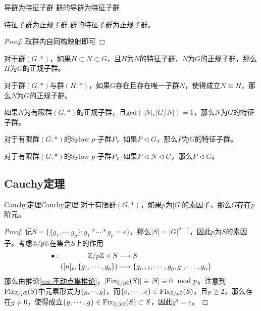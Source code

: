 \begin{proposition}{导群为特征子群}
	群的导群为特征子群
\end{proposition}

\begin{proposition}{特征子群为正规子群}
	群的特征子群为正规子群。
\end{proposition}

\begin{proof}
	取群内自同构映射即可
\end{proof}

\begin{proposition}
	对于群$(G,*)$，如果$H\subset N\subset G$，且$H$为$N$的特征子群，$N$为$G$的正规子群，那么$H$为$G$的正规子群。
\end{proposition}

\begin{proposition}
	对于群$(G,*)$与群$(H,*)$，如果$G$存在且存在唯一子群$N$，使得成立$N\cong H$，那么$N$为$G$的正规子群。
\end{proposition}

\begin{proposition}
	如果$N$为有限群$(G,*)$的正规子群，且$\text{gcd}(|N|,|G/N|)=1$，那么$N$为$G$的特征子群。
\end{proposition}

\begin{proposition}
	对于有限群$(G,*)$的Sylow $p$-子群$P$，如果$P\lhd G$，那么$P$为$G$的特征子群。
\end{proposition}

\begin{proposition}
	对于有限群$(G,*)$的Sylow $p$-子群$P$，如果$P\lhd N\lhd G$，那么$P\lhd G$。
\end{proposition}

\subsection{Cauchy定理}

\begin{theorem}{Cauchy定理}{Cauchy定理}
	对于有限群$(G,*)$，如果$p$为$|G|$的素因子，那么$G$存在$p$阶元。
\end{theorem}

\begin{proof}
	记$S=\{ \{g_1,\cdots,g_p\}:g_1*\cdots*g_p=e \}$，那么$|S|=|G|^{p-1}$，因此$p$为$S$的素因子。考虑$\mathbb{Z}/p\mathbb{Z}$在集合$S$上的作用
	\begin{align*}
		\bullet:\begin{aligned}[t]
			\mathbb{Z}/p\mathbb{Z}\times S&\longrightarrow S\\
			([n]_p,\{g_1,\cdots,g_p\})&\longmapsto\{ g_{n+1},\cdots,g_{p},g_1,\cdots,g_n \}
		\end{aligned}
	\end{align*}
	那么由推论\ref{cor:不动点集推论}，$|\mathrm{Fix}_{\mathbb{Z}/p\mathbb{Z}}(S)|\equiv |S|\equiv 0\mod p$。注意到$\mathrm{Fix}_{\mathbb{Z}/p\mathbb{Z}}(S)$中元素形式为$\{g,\cdots,g\}$，而$\{e,\cdots,e\}\in\mathrm{Fix}_{\mathbb{Z}/p\mathbb{Z}}(S)$，且$p\ge 2$，那么存在$g\ne 0$，使得成立$\{g,\cdots,g\}\in\mathrm{Fix}_{\mathbb{Z}/p\mathbb{Z}}(S)\subset S$，因此$g^n=e$。
\end{proof}

